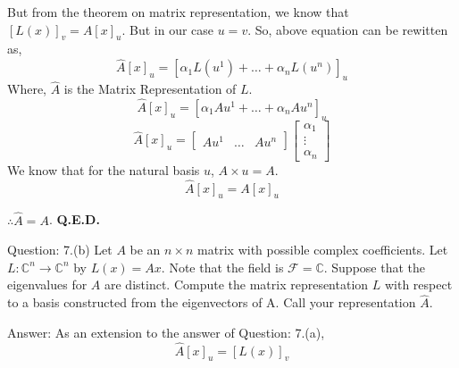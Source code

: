 \documentclass[a4paper]{article}
\begin{document}
\begin{qalist}
			But from the theorem on matrix representation, we know that ${[L(x)]}_{v} = A{[x]}_{u}$. But in our case $u = v$. So, above equation can be rewitten as, 
			\begin{equation}
				\hat{A}{[x]}_{u} = {[{\alpha}_{1}L({u}^{1}) + \ldots + {\alpha}_{n}L({u}^{n})]}_{u}
			\end{equation}
			Where, $\hat{A}$ is the Matrix Representation of $L$.
			\begin{equation}
				\hat{A}{[x]}_{u} = {[{\alpha}_{1}A{u}^{1} + \ldots + {\alpha}_{n}A{u}^{n}]}_{u}
			\end{equation}
			\begin{equation}
				\hat{A}{[x]}_{u} = 
					\begin{bmatrix}A{u}^{1} & \ldots & A{u}^{n}\end{bmatrix}
					\begin{bmatrix}{\alpha}_{1} \\ \vdots \\ {\alpha}_{n}\end{bmatrix}
			\end{equation}
			We know that for the natural basis $u$, %
			$A \times u = A$.
			\begin{equation}
				\hat{A}{[x]}_{u} = A {[x]}_{u}
			\end{equation}

			$\therefore \hat{A} = A$. \textbf{Q.E.D.}
			
		
		\item[Question: 7.(b)] \setcounter{equation}{0}  Let $A$ be an $n\times n$ matrix with possible complex coefficients. Let $L  : {\mathbb{C}}^{n} \rightarrow {\mathbb{C}}^{n}$ by $L(x) = Ax$. Note that the field is $\mathcal{F} = \mathbb{C}$. Suppose that the eigenvalues for $A$ are distinct. Compute the matrix representation $L$ with respect to a basis constructed from the eigenvectors of A. Call your representation $\hat{A}$.
		\item[Answer:] As an extension to the answer of Question: 7.(a), 
			\begin{equation}
				\hat{A}{[x]}_{u} = {[L(x)]}_{v}
			\end{equation}
			

\end{qalist}
\end{document}
